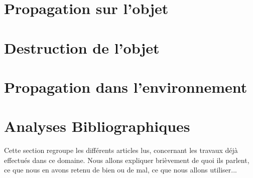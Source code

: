 \documentclass[a4paper,10pt]{article}
\begin{document}
\section{Propagation sur l'objet}





\section{Destruction de l'objet}





\section{Propagation dans l'environnement}




\section{Analyses Bibliographiques}
Cette section regroupe les différents articles lus, concernant les travaux déjà effectués dans ce domaine. 
Nous allons expliquer brièvement de quoi ils parlent, ce que nous en avons retenu de bien ou de mal, ce que nous allons 
utiliser...
\end{document}

